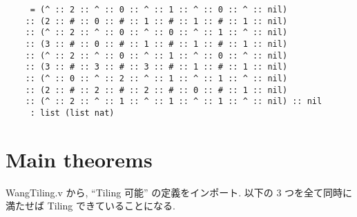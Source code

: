 \documentclass[12pt]{report}
\begin{document}
\begin{verbatim}
     = (^ :: 2 :: ^ :: 0 :: ^ :: 1 :: ^ :: 0 :: ^ :: nil)
    :: (2 :: # :: 0 :: # :: 1 :: # :: 1 :: # :: 1 :: nil)
    :: (^ :: 2 :: ^ :: 0 :: ^ :: 0 :: ^ :: 1 :: ^ :: nil)
    :: (3 :: # :: 0 :: # :: 1 :: # :: 1 :: # :: 1 :: nil)
    :: (^ :: 2 :: ^ :: 0 :: ^ :: 1 :: ^ :: 0 :: ^ :: nil)
    :: (3 :: # :: 3 :: # :: 3 :: # :: 1 :: # :: 1 :: nil)
    :: (^ :: 0 :: ^ :: 2 :: ^ :: 1 :: ^ :: 1 :: ^ :: nil)
    :: (2 :: # :: 2 :: # :: 2 :: # :: 0 :: # :: 1 :: nil)
    :: (^ :: 2 :: ^ :: 1 :: ^ :: 1 :: ^ :: 1 :: ^ :: nil) :: nil
     : list (list nat)
\end{verbatim}
  

 
\section{Main theorems}
WangTiling.v から, ``Tiling 可能'' の定義をインポート. 以下の 3 つを全て同時に満たせば Tiling できていることになる.
\end{document}
